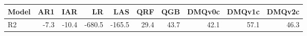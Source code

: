 \begin{tabular}{lrrrrrrrrr}
\toprule
Model & AR1 & IAR & LR & LAS & QRF & QGB & DMQv0c & DMQv1c & DMQv2c \\
\midrule
R2 & -7.3 & -10.4 & -680.5 & -165.5 & 29.4 & 43.7 & 42.1 & 57.1 & 46.3 \\
\bottomrule
\end{tabular}
